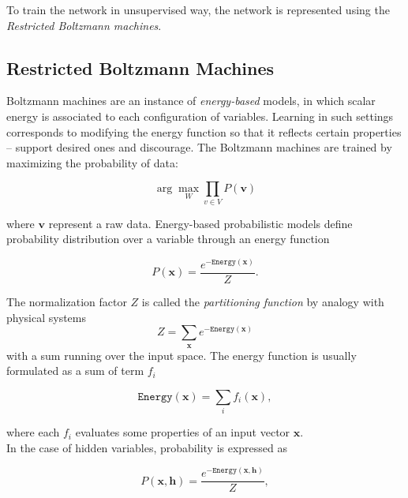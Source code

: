 To train the network in unsupervised way, the network is represented using the \textit{Restricted Boltzmann machines}.





\subsection{Restricted Boltzmann Machines}

Boltzmann machines are an instance of \textit{energy-based} models, in which  scalar energy is associated  to each configuration of variables. Learning in such settings corresponds to modifying the energy function so that it reflects certain properties -- support desired ones and discourage. The  Boltzmann machines are trained by maximizing the probability of data:

\begin{equation}
	 \arg\max_{W}\prod_{v \in V}P(\mathbf{v})
\end{equation}	
	
	
where $\mathbf{v}$ represent a raw data. Energy-based probabilistic models define  probability distribution over a variable through an energy function

\begin{equation}
	P(\mathbf{x}) = \frac{e^{-\mathtt{Energy}(\mathbf{x})}}{Z}.
\end{equation}

The normalization factor $Z$ is called the \textit{partitioning function} by analogy with physical systems
\begin{equation}
	Z = \sum_{\mathbf{x}}e^{-\mathtt{Energy}(\mathbf{x})}
\end{equation}
 with a sum running over the input space. The energy function is usually formulated as a sum of term $f_i$
 
 \begin{equation}
 	\mathtt{Energy}(\mathbf{x}) = \sum_i f_i(\mathbf{x}),
 \end{equation}
 
 where each $f_i$ evaluates some properties of an input vector $\mathbf{x}$. \\
 
 In the case of hidden variables, probability is expressed as 
 
 \begin{equation}
	P(\mathbf{x}, \mathbf{h}) = \frac{e^{-\mathtt{Energy}(\mathbf{x}, \mathbf{h})}}{Z},
\end{equation}
 
